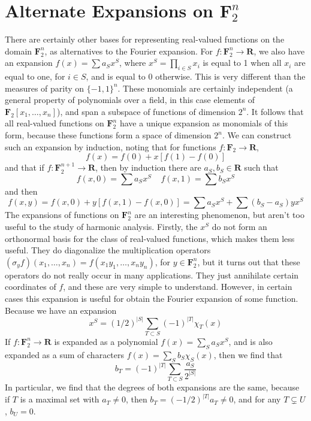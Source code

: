 \section{Alternate Expansions on $\mathbf{F}_2^n$}

There are certainly other bases for representing real-valued functions on the domain $\mathbf{F}_2^n$, as alternatives to the Fourier expansion. For $f: \mathbf{F}_2^n \to \mathbf{R}$, we also have an expansion $f(x) = \sum a_S x^S$, where $x^S = \prod_{i \in S} x_i$ is equal to 1 when all $x_i$ are equal to one, for $i \in S$, and is equal to 0 otherwise. This is very different than the measures of parity on $\{ -1, 1 \}^n$. These monomials are certainly independent (a general property of polynomials over a field, in this case elements of $\mathbf{F}_2[x_1, \dots, x_n]$), and span a subspace of functions of dimension $2^n$. It follows that all real-valued functions on $\mathbf{F}_2^n$ have a unique expansion as monomials of this form, because these functions form a space of dimension $2^n$. We can construct such an expansion by induction, noting that for functions $f: \mathbf{F}_2 \to \mathbf{R}$,
%
\[ f(x) = f(0) + x[f(1) - f(0)] \]
%
and that if $f: \mathbf{F}_2^{n+1} \to \mathbf{R}$, then by induction there are $a_S, b_S \in \mathbf{R}$ such that
%
\[ f(x,0) = \sum a_S x^S\ \ \ \ \ f(x,1) = \sum b_S x^S \]
%
and then
%
\[ f(x,y) = f(x,0) + y[f(x,1) - f(x,0)] = \sum a_S x^S + \sum (b_S - a_S) yx^S \]
%
The expansions of functions on $\mathbf{F}_2^n$ are an interesting phenomenon, but aren't too useful to the study of harmonic analysis. Firstly, the $x^S$ do not form an orthonormal basis for the class of real-valued functions, which makes them less useful. They do diagonalize the multiplication operators $(\sigma_y f)(x_1, \dots, x_n) = f(x_1y_1, \dots, x_ny_n)$, for $y \in \mathbf{F}^n_2$, but it turns out that these operators do not really occur in many applications. They just annihilate certain coordinates of $f$, and these are very simple to understand. However, in certain cases this expansion is useful for obtain the Fourier expansion of some function. Because we have an expansion
%
\[ x^S = \left( 1/2 \right)^{|S|} \sum_{T \subset S} (-1)^{|T|} \chi_T(x) \]
%
If $f: \mathbf{F}_2^n \to \mathbf{R}$ is expanded as a polynomial $f(x) = \sum_S a_S x^S$, and is also expanded as a sum of characters $f(x) = \sum_S b_S \chi_S(x)$, then we find that
%
\[ b_T = (-1)^{|T|} \sum_{T \subset S} \frac{a_S}{2^{|S|}}  \]
%
In particular, we find that the degrees of both expansions are the same, because if $T$ is a maximal set with $a_T \neq 0$, then $b_T = (-1/2)^{|T|} a_T \neq 0$, and for any $T \subsetneq U$, $b_U = 0$.

